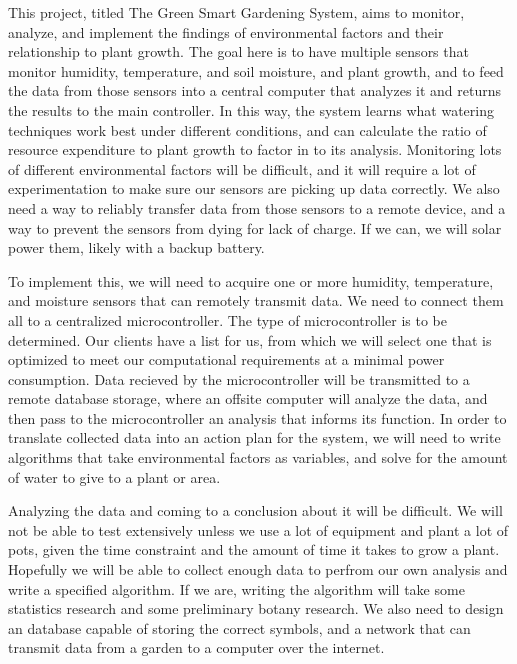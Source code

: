 \documentclass[letterpaper, 10pt, fleqn]{article}
\begin{document}
	This project, titled The Green Smart Gardening System, aims to monitor, analyze, and implement the findings of environmental factors and their relationship to plant growth. The goal here is to have multiple sensors that monitor humidity, temperature, and soil moisture, and plant growth, and to feed the data from those sensors into a central computer that analyzes it and returns the results to the main controller. In this way, the system learns what watering techniques work best under different conditions, and can calculate the ratio of resource expenditure to plant growth to factor in to its analysis. Monitoring lots of different environmental factors will be difficult, and it will require a lot of experimentation to make sure our sensors are picking up data correctly. We also need a way to reliably transfer data from those sensors to a remote device, and a way to prevent the sensors from dying for lack of charge. If we can, we will solar power them, likely with a backup battery.   

	To implement this, we will need to acquire one or more humidity, temperature, and moisture sensors that can remotely transmit data. We need to connect them all to a centralized microcontroller. The type of microcontroller is to be determined. Our clients have a list for us, from which we will select one that is optimized to meet our computational requirements at a minimal power consumption. Data recieved by the microcontroller will be transmitted to a remote database storage, where an offsite computer will analyze the data, and then pass to the microcontroller an analysis that informs its function. In order to translate collected data into an action plan for the system, we will need to write algorithms that take environmental factors as variables, and solve for the amount of water to give to a plant or area. 


	Analyzing the data and coming to a conclusion about it will be difficult. We will not be able to test extensively unless we use a lot of equipment and plant a lot of pots, given the time constraint and the amount of time it takes to grow a plant. Hopefully we will be able to collect enough data to perfrom our own analysis and write a specified algorithm. If we are, writing the algorithm will take some statistics research and some preliminary botany research. We also need to design an database capable of storing the correct symbols, and a network that can transmit data from a garden to a computer over the internet. 
\end{document}
